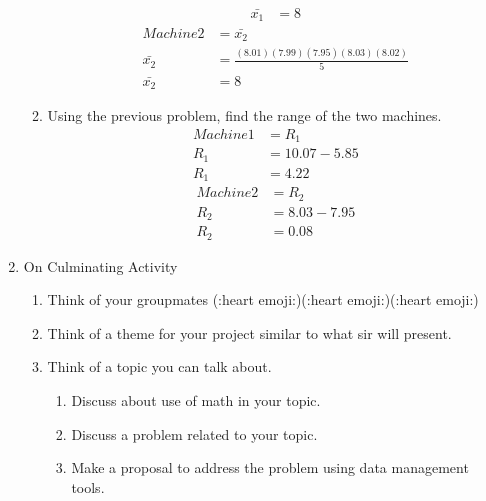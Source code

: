 \documentclass{article}
\begin{document}
\begin{enumerate}
\begin{enumerate}
\begin{align*}
                        \bar{x_1}&=8 
                    \end{align*}               
                    \begin{align*}
                        Machine 2&=\bar{x_2} \\
                        \bar{x_2}&=\frac{(8.01)(7.99)(7.95)(8.03)(8.02)}{5} \\
                        \bar{x_2}&=8 
                    \end{align*}                 
            \item Using the previous problem, find the range of the two machines.
                \begin{equation}
                    \begin{aligned}
                        Machine 1&=R_1 \\
                        R_1&=10.07-5.85 \\
                        R_1&=4.22
                    \end{aligned}               
                \end{equation}
                \begin{equation}
                    \begin{aligned}
                        Machine 2&=R_2 \\
                        R_2&=8.03-7.95 \\
                        R_2&=0.08
                    \end{aligned}               
                \end{equation}
        \end{enumerate}
    \item On Culminating Activity
        \begin{enumerate}
            \item Think of your groupmates (:heart emoji:)(:heart emoji:)(:heart emoji:)
            \item Think of a theme for your project similar to what sir will present.
            \item Think of a topic you can talk about.
            \begin{enumerate}
                \item Discuss about use of math in your topic.
                \item Discuss a problem related to your topic.
                \item Make a proposal to address the problem using data management tools.
            \end{enumerate}
        \end{enumerate}
\end{enumerate}
\end{document}
